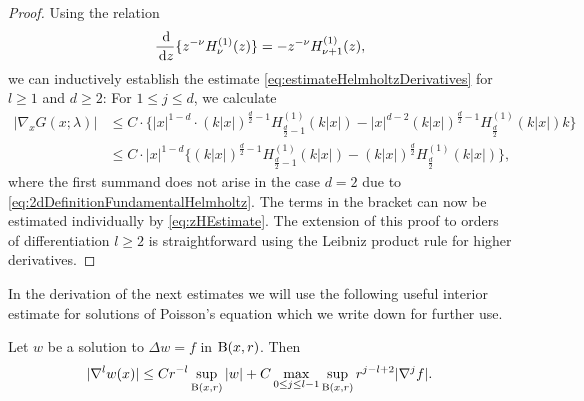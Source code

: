 \begin{proof}
  Using the relation
  \begin{align*}
    \frac{\, {\operatorname{d}\!{}}}{\, {\operatorname{d}\!{z}}} \{ z^{-\nu} H_\nu^{(1)}(z) \} = -z^{-\nu} H_{\nu + 1}^{(1)} (z),
  \end{align*}
  we can inductively establish the estimate \eqref{eq:estimateHelmholtzDerivatives} for $l \geq 1$ and $d \geq 2$:
  For $1 \leq j \leq d$, we calculate
  \begin{align*}
    |\nabla_x^{} G(x; \lambda)|
    &\leq C  \cdot \big\{|x|^{1 - d} \cdot (k|x|)^{\frac{d}{2} - 1} H_{\frac{d}{2} - 1}^{(1)}(k|x|) - |x|^{d - 2} (k|x|)^{\frac{d}{2} - 1} H_{\frac{d}{2}}^{(1)}(k|x|) k\big\} \\
    &\leq C \cdot |x|^{1 - d}\big\{(k|x|)^{\frac{d}{2} - 1} H_{\frac{d}{2} - 1}^{(1)}(k|x|) -  (k|x|)^{\frac{d}{2}} H_{\frac{d}{2}}^{(1)}(k|x|) \big\},
  \end{align*}
  where the first summand does not arise in the case $d = 2$ due to \eqref{eq:2dDefinitionFundamentalHelmholtz}.
  The terms in the bracket can now be estimated individually by \eqref{eq:zHEstimate}.
  The extension of this proof to orders of differentiation $l \geq 2$ is straightforward using the Leibniz product rule for higher derivatives.
\end{proof}

In the derivation of the next estimates we will use the following useful interior estimate for solutions of Poisson's equation which we write down for further use.

\begin{lem}
  \label{lem:interiorEstimatePoisson}
  Let $w$ be a solution to $\Delta w = f$ in $\mathrm{B}(x,r)$. Then
  \begin{align}
    \label{eq:interiorEstimatePoisson}
    |\nabla^l w(x)| \leq C r^{-l} \sup_{\mathrm{B}(x,r)} |w| + C \max_{0 \leq j \leq l - 1} \sup_{\mathrm{B}(x,r)} r^{j - l + 2} |\nabla^j f|.
  \end{align}
\end{lem}


